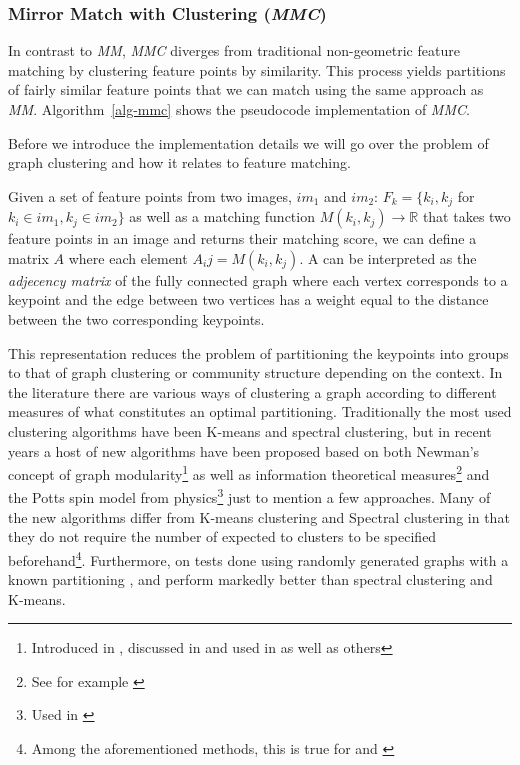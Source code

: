 \documentclass{article}
\begin{document}
\subsubsection{Mirror Match with Clustering (\emph{MMC})}
%
In contrast to \emph{MM}, \emph{MMC} diverges from traditional 
non-geometric feature matching by clustering feature points by 
similarity. This process yields partitions of fairly similar feature 
points that we can match using the same approach as \emph{MM}.  
Algorithm~\ref{alg-mmc} shows the pseudocode implementation of \emph{MMC}.

Before we introduce the implementation details we will go over the 
problem of graph clustering and how it relates to feature matching.

Given a set of feature points from two images, $im_1$ and $im_2$: $F_k = 
\{k_i, k_j$ for $k_i \in im_1, k_j \in im_2\}$ as well as a matching 
function $M(k_i, k_j) \rightarrow \mathbb{R}$ that takes two feature 
points in an image and returns their matching score, we can define a 
matrix $A$ where each element $A_ij = M(k_i, k_j)$. A can be interpreted 
as the \emph{adjecency matrix} of the fully connected graph where each 
vertex corresponds to a keypoint and the edge between two vertices has a 
weight equal to the distance between the two corresponding keypoints.

This representation reduces the problem of partitioning the keypoints 
into groups to that of graph clustering or community structure depending 
on the context. In the literature there are various ways of clustering a 
graph according to different measures of what constitutes an optimal 
partitioning. Traditionally the most used clustering algorithms have 
been K-means and spectral clustering, but in recent years a host of new 
algorithms have been proposed based on both Newman's concept of graph 
modularity\footnote{Introduced in \cite{girvan2002}, discussed in 
\cite{brandes2007} and used in \cite{blondel2008} as well as others} as 
well as information theoretical measures\footnote{See for example 
\cite{rosvall2008}} and the Potts spin model from physics\footnote{Used 
in \cite{ronhovde2009}} just to mention a few approaches. Many of the 
new algorithms differ from K-means clustering and Spectral clustering 
in that they do not require the number of expected to clusters to be 
specified beforehand\footnote{Among the aforementioned methods, this is 
true for \cite{blondel2008} and \cite{rosvall2008}}.  Furthermore, on 
tests done using randomly generated graphs with a known partitioning 
\cite{blondel2008}, \cite{rosvall2008} and \cite{ronhovde2009} perform 
markedly better than spectral clustering and 
K-means\cite{lancichinetti2009}.
\end{document}
